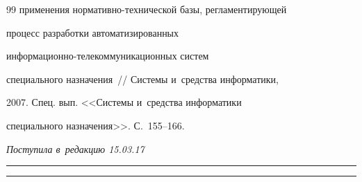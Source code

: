 {{\begin{thebibliography}{99}
применения нор\-ма\-тив\-но-тех\-ни\-че\-ской базы, регламентирующей 


процесс разработки автоматизированных  


ин\-фор\-ма\-ци\-он\-но-те\-ле\-ком\-му\-ни\-ка\-ци\-он\-ных сис\-тем 


специального назначения~/\!\!/ Сис\-те\-мы и~средства информатики, 


2007. Спец. вып. <<Системы и~средства информатики 


специального назначения>>. С.~155--166.


         \end{thebibliography}


} }








\vspace*{-9pt}





\hfill{\small\textit{Поступила в~редакцию 15.03.17}}














\vspace*{7pt}





\hrule





\vspace*{2pt}















\hrule
















